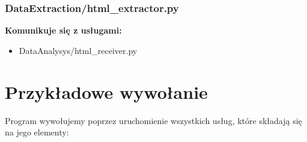 \documentclass[12pt]{article}
\begin{document}
\subsubsection{DataExtraction/html\_extractor.py} 
\textbf{Komunikuje się z usługami:}\\
\begin{itemize}
\item DataAnalysys/html\_receiver.py
\end{itemize} 

\section{Przykładowe wywołanie}
Program wywołujemy poprzez uruchomienie wszystkich usług, które składają się na jego elementy:

\end{document}
